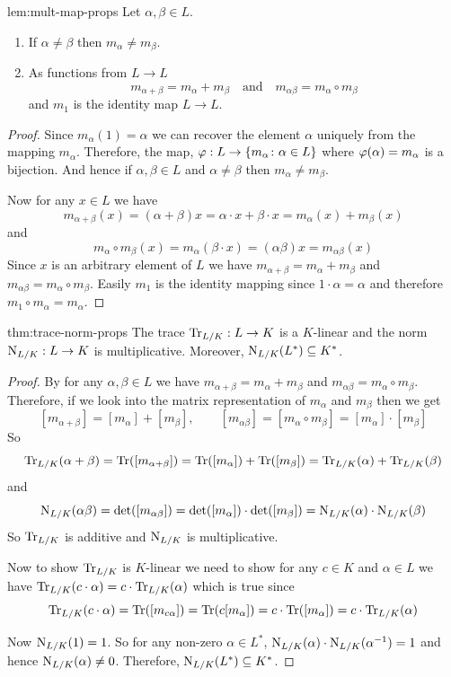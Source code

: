 \begin{lemma}{}{lem:mult-map-props}
  Let $\alpha,\beta\in L$. \begin{enumerate}[label=(\roman*)]
    \item If $\alpha\neq \beta$ then $m_{\alpha}\neq m_{\beta}$.
    \item As functions from $L\to L$ $$m_{\alpha+\beta}=m_{\alpha}+m_{\beta}\quad\text{and}\quad m_{\alpha\beta}=m_{\alpha}\circ m_{\beta}$$and $m_1$ is the identity map $L\to L$.
  \end{enumerate}
\end{lemma}
\begin{proof}
  Since $m_{\alpha}(1)=\alpha$ we can recover the element $\alpha$ uniquely from the mapping $m_{\alpha}$.
  Therefore, the map, $\varphi:L\to \{m_{\alpha}\colon \alpha\in L\}$ where $\varphi(\alpha)=m_{\alpha}$ is a bijection.
  And hence if $\alpha,\beta\in L$ and $\alpha\neq \beta$ then $m_{\alpha}\neq m_{\beta}$.

  Now for any $x\in L$ we have $$m_{\alpha+\beta}(x)=(\alpha+\beta)x=\alpha\cdot x+\beta\cdot x=m_{\alpha}(x)+m_{\beta}(x)$$and $$m_{\alpha}\circ m_{\beta}(x)=m_{\alpha}(\beta \cdot x)=(\alpha\beta)x=m_{\alpha\beta}(x)$$
  Since $x$ is an arbitrary element of $L$ we have $m_{\alpha+\beta}=m_{\alpha}+m_{\beta}$ and $m_{\alpha\beta}=m_{\alpha}\circ m_{\beta}$. Easily $m_1$ is the identity mapping since $1\cdot \alpha=\alpha$ and therefore $m_1\circ m_{\alpha}=m_{\alpha}$.
\end{proof}

\begin{Theorem}{}{thm:trace-norm-props}
  The trace $\operatorname{Tr}_{L/K}:L\to K$ is a $K$-linear and the norm $\operatorname{N}_{L/K}:L\to K$ is multiplicative.
  Moreover, $\operatorname{N}_{L/K}(L^*)\subseteq K^*$.
\end{Theorem}
\begin{proof}
  By \MultMapPropslem for any $\alpha,\beta\in L$ we have $m_{\alpha+\beta}=m_{\alpha}+m_{\beta}$ and $m_{\alpha\beta}=m_{\alpha}\circ m_{\beta}$.
  Therefore, if we look into the matrix representation of $m_{\alpha}$ and $m_{\beta}$ then we get
  $$[m_{\alpha+\beta}]=[m_{\alpha}]+[m_{\beta}],\qquad [m_{\alpha\beta}]=[m_{\alpha}\circ m_{\beta}]=[m_{\alpha}]\cdot [m_{\beta}]$$
  So $$\operatorname{Tr}_{L/K}(\alpha+\beta)=\operatorname{Tr}([m_{\alpha+\beta}])=\operatorname{Tr}([m_{\alpha}])+\operatorname{Tr}([m_{\beta}])=\operatorname{Tr}_{L/K}(\alpha)+\operatorname{Tr}_{L/K}(\beta)$$ and $$\operatorname{N}_{L/K}(\alpha\beta)=\det([m_{\alpha\beta}])=\det([m_{\alpha}])\cdot \det([m_{\beta}])=\operatorname{N}_{L/K}(\alpha)\cdot \operatorname{N}_{L/K}(\beta)$$So $\operatorname{Tr}_{L/K}$ is additive and $\operatorname{N}_{L/K}$ is multiplicative.

  Now to show $\operatorname{Tr}_{L/K}$ is $K$-linear we need to show for any $c\in K$ and $\alpha\in L$ we have $\operatorname{Tr}_{L/K}(c\cdot \alpha)=c\cdot \operatorname{Tr}_{L/K}(\alpha)$ which is true since $$\operatorname{Tr}_{L/K}(c\cdot \alpha)=\operatorname{Tr}([m_{c\alpha}])=\operatorname{Tr}(c[m_{\alpha}])=c\cdot \operatorname{Tr}([m_{\alpha}])=c\cdot \operatorname{Tr}_{L/K}(\alpha)$$

  Now $\operatorname{N}_{L/K}(1)=1$. So for any non-zero $\alpha\in L^*$, $\operatorname{N}_{L/K}(\alpha)\cdot \operatorname{N}_{L/K}(\alpha^{-1})=1$ and hence $\operatorname{N}_{L/K}(\alpha)\neq 0$. Therefore, $\operatorname{N}_{L/K}(L^*)\subseteq K^*$.
\end{proof}

